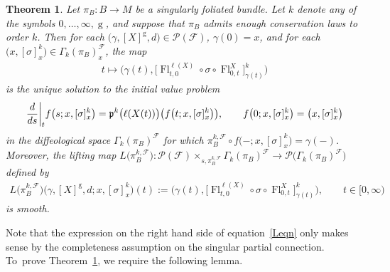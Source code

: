 \documentclass[11pt]{article}
\numberwithin{equation}{section}
\numberwithin{equation}{section}
\newtheorem{Theorem}{Theorem}[section]
\def\g{\operatorname{g}}
\def\Fl{\operatorname{Fl}}
\def\FF{{\mathcal{F}}}
\def\PP{{\mathcal{P}}}
\def\pf{{\mathfrak{p}}}
\begin{document}
\begin{Theorem}\label{liftsmooth}
Let $\pi_{B}\colon B\rightarrow M$ be a singularly foliated bundle. Let $k$ denote any of the symbols $0,\dots,\infty,\g$, and suppose that $\pi_{B}$ admits enough conservation laws to order $k$. Then for each $\big(\gamma,[X]^{\g},d\big)\in\PP(\FF)$, $\gamma(0) = x$, and for each $\big(x,[\sigma]^{k}_{x}\big)\in\Gamma_{k}(\pi_{B})^{\FF}_{x}$, the map
\begin{gather}\label{ivpsol}
t\mapsto\big(\gamma(t),\big[\Fl^{\ell(X)}_{t,0}\circ\sigma\circ\Fl^{X}_{0,t}\big]^{k}_{\gamma(t)}\big)
\end{gather}
is the unique solution to the initial value problem
\begin{gather}\label{ivp}
\frac{\rm d}{{\rm d}s}\bigg|_{t}f\big(s;x,[\sigma]^{k}_{x}\big) = \pf^{k}\big(\ell(X(t))\big)\big(f\big(t;x,[\sigma]^{k}_{x}\big)\big),\qquad
f\big(0;x,[\sigma]^{k}_{x}\big) = \big(x,[\sigma]^{k}_{x}\big)
\end{gather}
in the diffeological space $\Gamma_{k}(\pi_{B})^{\FF}$ for which $\pi_{B}^{k,\FF}\circ f\big({-};x,[\sigma]^{k}_{x}\big) = \gamma(-)$. Moreover, the lifting map $L\big(\pi_{B}^{k,\FF}\big)\colon \PP(\FF)\times_{s,\pi_{B}^{k,\FF}}\Gamma_{k}(\pi_{B})^{\FF}\rightarrow \PP\big(\Gamma_{k}(\pi_{B})^{\FF}\big)$ defined by
\begin{gather}\label{Leqn}
L\big(\pi_{B}^{k,\FF}\big)\big(\gamma,[X]^{\g},d;x,[\sigma]^{k}_{x}\big)(t):=
\big(\gamma(t),\big[\Fl^{\ell(X)}_{t,0}\circ\sigma\circ\Fl^{X}_{0,t}\big]^{k}_{\gamma(t)}\big),\qquad t\in[0,\infty)
\end{gather}
is smooth.
\end{Theorem}

Note that the expression on the right hand side of equation~\eqref{Leqn} only makes sense by the completeness assumption on the singular partial connection. To~prove Theorem~\ref{liftsmooth}, we require the following lemma.
\end{document}
